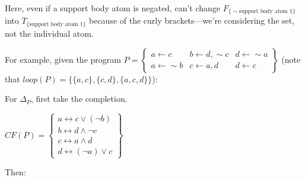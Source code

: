 \documentclass[9pt,a4paper,landscape]{article}
\newcommand{\ngtb}[1]{T_{ \{#1\} }}
\newcommand{\ngfb}[1]{F_{ \{#1\} }}
\begin{document}
{Here, even if a support body atom is negated, can't change $\ngfb{{\sim} \text{support body atom 1}}$ into $\ngtb{\text{support body atom 1}}$ because of the curly brackets---we're considering the set, not the individual atom.

\vspace{\baselineskip}

For example, given the program $P = \left\{\begin{array}{lll}
a \leftarrow c & b \leftarrow d, {\sim} c & d \leftarrow {\sim} a\\
a \leftarrow {\sim} b & c \leftarrow a, d & d \leftarrow c
\end{array}\right\}$ (note that $loop(P) = \{ \{a, c\}, \{c, d\}, \{a, c, d\} \}$):

For $\Delta_P$, first take the completion.

\begin{center}
	$CF(P) = \left\{\begin{array}{l}
a \leftrightarrow c \lor (\neg b) \\
b \leftrightarrow d \land \neg c \\
c \leftrightarrow a \land d \\
d \leftrightarrow (\neg a) \lor c
\end{array}\right\}$
\end{center}

\pagebreak

Then:

}
\end{document}
